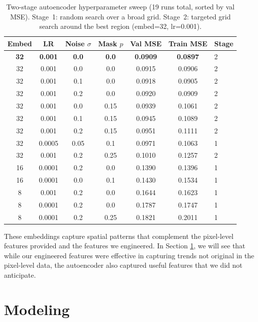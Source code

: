 \documentclass[11pt,letterpaper]{article}
\begin{document}
\begin{table}[h!]
\centering
\label{tab:ae_sweep}
\small
\begin{tabular}{ccccccl}
\toprule
Embed & LR & Noise $\sigma$ & Mask $p$ & Val MSE & Train MSE & Stage \\
\midrule
\textbf{32} & \textbf{0.001} & \textbf{0.0} & \textbf{0.0} & \textbf{0.0909} & \textbf{0.0897} & 2 \\
32 & 0.001 & 0.0 & 0.0 & 0.0915 & 0.0906 & 2 \\
32 & 0.001 & 0.1 & 0.0 & 0.0918 & 0.0905 & 2 \\
32 & 0.001 & 0.2 & 0.0 & 0.0920 & 0.0909 & 2 \\
32 & 0.001 & 0.0 & 0.15 & 0.0939 & 0.1061 & 2 \\
32 & 0.001 & 0.1 & 0.15 & 0.0945 & 0.1089 & 2 \\
32 & 0.001 & 0.2 & 0.15 & 0.0951 & 0.1111 & 2 \\
32 & 0.0005 & 0.05 & 0.1 & 0.0971 & 0.1063 & 1 \\
32 & 0.001 & 0.2 & 0.25 & 0.1010 & 0.1257 & 2 \\
\midrule
16 & 0.0001 & 0.2 & 0.0 & 0.1390 & 0.1396 & 1 \\
16 & 0.0001 & 0.0 & 0.1 & 0.1430 & 0.1534 & 1 \\
8 & 0.001 & 0.2 & 0.0 & 0.1644 & 0.1623 & 1 \\
8 & 0.0001 & 0.2 & 0.0 & 0.1787 & 0.1747 & 1 \\
8 & 0.0001 & 0.2 & 0.25 & 0.1821 & 0.2011 & 1 \\
\bottomrule
\end{tabular}
\caption{Two-stage autoencoder hyperparameter sweep (19 runs total, sorted by val MSE). Stage~1: random search over a broad grid. Stage~2: targeted grid search around the best region (embed=32, lr=0.001).}
\end{table}

\newpage

These embeddings capture spatial patterns that complement the pixel-level features provided and the features we engineered. In Section \ref{sec:model}, we will see that while our engineered features were effective in capturing trends not original in the pixel-level data, the autoencoder also captured useful features that we did not anticipate.

\section{Modeling}
\label{sec:model}
\end{document}
